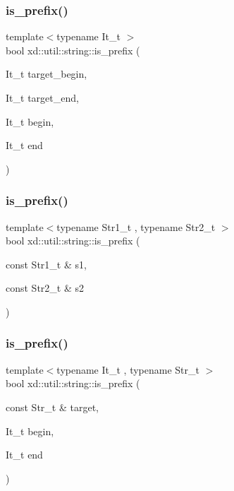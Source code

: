 \subsubsection{\texorpdfstring{is\+\_\+prefix()}{is\_prefix()}\hspace{0.1cm}{\footnotesize\ttfamily [1/3]}}
{\footnotesize\ttfamily template$<$typename It\+\_\+t $>$ \\
bool xd\+::util\+::string\+::is\+\_\+prefix (\begin{DoxyParamCaption}\item[{It\+\_\+t}]{target\+\_\+begin,  }\item[{It\+\_\+t}]{target\+\_\+end,  }\item[{It\+\_\+t}]{begin,  }\item[{It\+\_\+t}]{end }\end{DoxyParamCaption})}

\mbox{\label{namespacexd_1_1util_1_1string_a24b0ab7d5012342c113ea60dbc1fef43}} 
\subsubsection{\texorpdfstring{is\+\_\+prefix()}{is\_prefix()}\hspace{0.1cm}{\footnotesize\ttfamily [2/3]}}
{\footnotesize\ttfamily template$<$typename Str1\+\_\+t , typename Str2\+\_\+t $>$ \\
bool xd\+::util\+::string\+::is\+\_\+prefix (\begin{DoxyParamCaption}\item[{const Str1\+\_\+t \&}]{s1,  }\item[{const Str2\+\_\+t \&}]{s2 }\end{DoxyParamCaption})}

\mbox{\label{namespacexd_1_1util_1_1string_a9a7d78daf733e49ea8e009343d1b8660}} 
\subsubsection{\texorpdfstring{is\+\_\+prefix()}{is\_prefix()}\hspace{0.1cm}{\footnotesize\ttfamily [3/3]}}
{\footnotesize\ttfamily template$<$typename It\+\_\+t , typename Str\+\_\+t $>$ \\
bool xd\+::util\+::string\+::is\+\_\+prefix (\begin{DoxyParamCaption}\item[{const Str\+\_\+t \&}]{target,  }\item[{It\+\_\+t}]{begin,  }\item[{It\+\_\+t}]{end }\end{DoxyParamCaption})}

